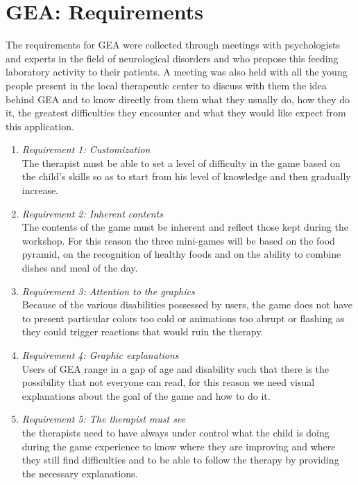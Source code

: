 \documentclass{sigchi-ext}
\begin{document}
\section{GEA: Requirements}
The requirements for GEA were collected through meetings with psychologists and experts in the field of neurological disorders and who propose this feeding laboratory activity to their patients. A meeting was also held with all the young people present in the local therapeutic center to discuss with them the idea behind GEA and to know directly from them what they usually do, how they do it, the greatest difficulties they encounter and what they would like expect from this application.
\begin{enumerate}
\item \textit{Requirement 1: Customization}\\
      The therapist must be able to set a level of difficulty in the game based on the child's skills so 		  as to start from his level of knowledge and then gradually increase.
\item \textit{Requirement 2: Inherent contents}\\
	  The contents of the game must be inherent and reflect those kept during the workshop. For this 			  reason the three mini-games will be based on the food pyramid, on the recognition of healthy foods 		  and on the ability to combine dishes and meal of the day.
\item \textit{Requirement 3: Attention to the graphics}\\
	  Because of the various disabilities possessed by users, the game does not have to present particular 	  colors too cold or animations too abrupt or flashing as they could trigger reactions that would ruin 	  the therapy.
\item \textit{Requirement 4: Graphic explanations}\\
	  Users of GEA range in a gap of age and disability such that there is the possibility that not 			  everyone can read, for this reason we need visual explanations about the goal of the game and how to 	  do it.
\item \textit{Requirement 5: The therapist must see}\\
	  the therapists need to have always under control what the child is doing during the game experience 		  to know where they are improving and where they still find difficulties and to be able to follow the 	  therapy by providing the necessary explanations.
\end{enumerate}
\end{document}
